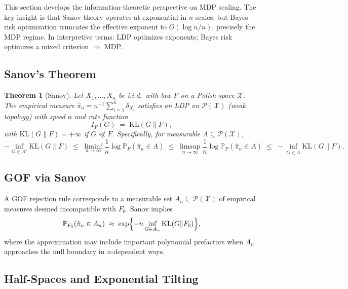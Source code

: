 \documentclass[11pt]{article}
\newcommand{\KL}{\mathrm{KL}}
\newcommand{\calX}{\mathcal{X}}
\newcommand{\calP}{\mathcal{P}}
\newcommand{\1}{\mathbf{1}}
\newcommand{\PP}{\mathbb{P}}
\theoremstyle{plain}
\newtheorem{theorem}{Theorem}[section]
\theoremstyle{definition}
\theoremstyle{remark}
\begin{document}
This section develops the information-theoretic perspective on MDP scaling. The key insight is that Sanov theory operates at exponential-in-$n$ scales, but Bayes-risk optimization truncates the effective exponent to $O(\log n/n)$, precisely the MDP regime.
In interpretive terms: LDP optimizes exponents; Bayes risk optimizes a mixed criterion $\Rightarrow$ MDP.

\subsection{Sanov's Theorem}

\begin{theorem}[Sanov]\label{thm:sanov}
Let $X_1,\ldots,X_n$ be i.i.d.\ with law $F$ on a Polish space $\calX$.
The empirical measure $\hat{\pi}_n=n^{-1}\sum_{i=1}^n \delta_{X_i}$ satisfies an LDP on $\calP(\calX)$ (weak topology) with speed $n$ and rate function \citep[see][Ch.~11]{CoverThomas2006}
\begin{equation}\label{eq:sanov-rate}
I_F(G)\;=\;\KL(G\|F),
\end{equation}
with $\KL(G\|F)=+\infty$ if $G\not\ll F$.
Specifically, for measurable $A\subseteq\calP(\calX)$,
\begin{equation}\label{eq:sanov-ldp}
-\inf_{G\in A^\circ}\KL(G\|F)
\;\le\;
\liminf_{n\to\infty}\frac1n\log\PP_F(\hat{\pi}_n\in A)
\;\le\;
\limsup_{n\to\infty}\frac1n\log\PP_F(\hat{\pi}_n\in A)
\;\le\;
-\inf_{G\in\bar A}\KL(G\|F).
\end{equation}
\end{theorem}


\subsection{GOF via Sanov}

A GOF rejection rule corresponds to a measurable set $A_n\subseteq\calP(\calX)$ of empirical measures deemed incompatible with $F_0$. Sanov implies
\begin{equation}\label{eq:sanov-gof}
\PP_{F_0}(\hat{\pi}_n\in A_n)
\;\approx\;
\exp\Bigl\{-n\inf_{G\in A_n}\KL(G\|F_0)\Bigr\},
\end{equation}
where the approximation may include important polynomial prefactors when $A_n$ approaches the null boundary in $n$-dependent ways.


\subsection{Half-Spaces and Exponential Tilting}
\end{document}
